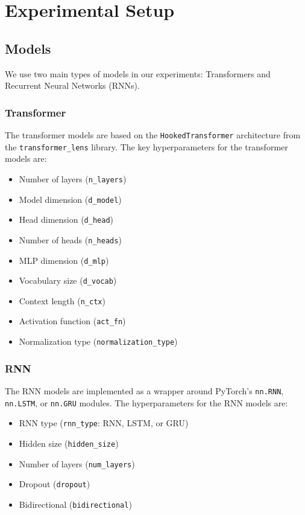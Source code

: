 
\section{Experimental Setup}

\subsection{Models}
We use two main types of models in our experiments: Transformers and Recurrent Neural Networks (RNNs).

\subsubsection{Transformer}
The transformer models are based on the \texttt{HookedTransformer} architecture from the \texttt{transformer_lens} library. The key hyperparameters for the transformer models are:
\begin{itemize}
    \item Number of layers (\texttt{n_layers})
    \item Model dimension (\texttt{d_model})
    \item Head dimension (\texttt{d_head})
    \item Number of heads (\texttt{n_heads})
    \item MLP dimension (\texttt{d_mlp})
    \item Vocabulary size (\texttt{d_vocab})
    \item Context length (\texttt{n_ctx})
    \item Activation function (\texttt{act_fn})
    \item Normalization type (\texttt{normalization_type})
\end{itemize}

\subsubsection{RNN}
The RNN models are implemented as a wrapper around PyTorch's \texttt{nn.RNN}, \texttt{nn.LSTM}, or \texttt{nn.GRU} modules. The hyperparameters for the RNN models are:
\begin{itemize}
    \item RNN type (\texttt{rnn_type}: RNN, LSTM, or GRU)
    \item Hidden size (\texttt{hidden_size})
    \item Number of layers (\texttt{num_layers})
    \item Dropout (\texttt{dropout})
    \item Bidirectional (\texttt{bidirectional})
\end{itemize}

